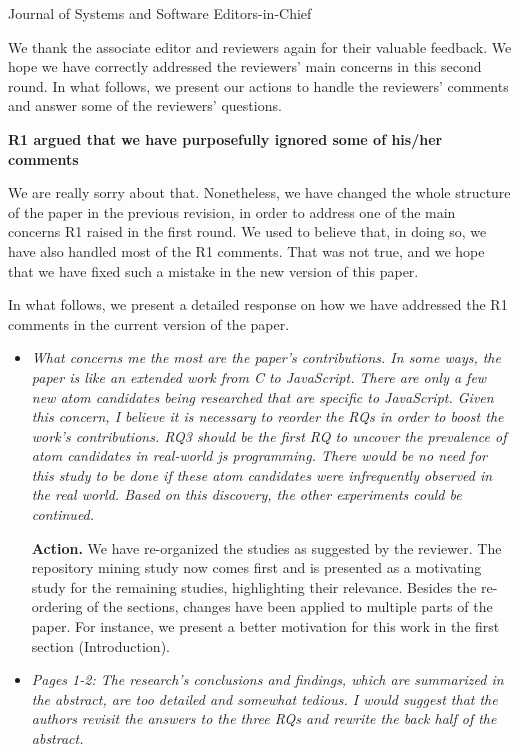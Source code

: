 \documentclass{letter}
\begin{document}
\newcommand{\comment}[1]{\emph{#1}}

\begin{letter}{Journal of Systems and Software Editors-in-Chief}
  
  \opening{}


  We thank the associate editor and reviewers again for their valuable feedback.
  We hope we have correctly addressed the reviewers' main concerns in this second round.
  In what follows, we present our actions to handle the reviewers' comments and answer some of the reviewers' questions.


{\bf R1 argued that we have purposefully ignored some of his/her comments}

We are really sorry about that. Nonetheless, we have changed
the whole structure of the paper in the previous revision, in order
to address one of the main concerns R1 raised in the first round.
We used to believe that, in doing so, we have also handled
most of the R1 comments. That was not true, and we hope that we
have fixed such a mistake in the new version of this paper.

In what follows, we present a detailed response on how we have addressed
the R1 comments in the current version of the paper.

\begin{itemize}
  
\item \comment{What concerns me the most are the paper's contributions. In some ways, the paper is like an extended work from C to JavaScript. There are only a few new atom candidates being researched that are specific to JavaScript. Given this concern, I believe it is necessary to reorder the RQs in order to boost the work's contributions. RQ3 should be the first RQ to uncover the prevalence of atom candidates in real-world js programming. There would be no need for this study to be done if these atom candidates were infrequently observed in the real world. Based on this discovery, the other experiments could be continued.}


{\bf Action.} We have re-organized the studies as suggested by the reviewer. The repository mining study now comes first and is presented as a motivating study for the remaining studies, highlighting their relevance. Besides the re-ordering of the sections, changes have been applied to multiple parts of the paper. For instance, we present a better motivation for this work in the first section (Introduction).


\item \comment{Pages 1-2: The research's conclusions and findings, which are summarized in the abstract, are too detailed and somewhat tedious. I would suggest that the authors revisit the answers to the three RQs and rewrite the back half of the abstract.}


\end{itemize}
\end{letter}
\end{document}
